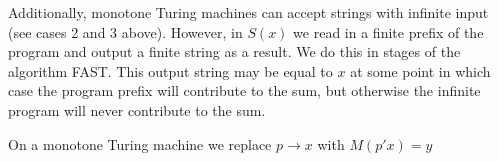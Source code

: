 Additionally, monotone Turing machines can accept strings with infinite input (see cases 2 and 3 above). However, in $S(x)$ we read in a finite prefix of the program and output a finite string as a result. We do this in stages of the algorithm FAST. This output string may be equal to $x$ at some point in which case the program prefix will contribute to the sum, but otherwise the infinite program will never contribute to the sum.

On a monotone Turing machine we replace $p \rightarrow x$ with $M(p'x) = y$